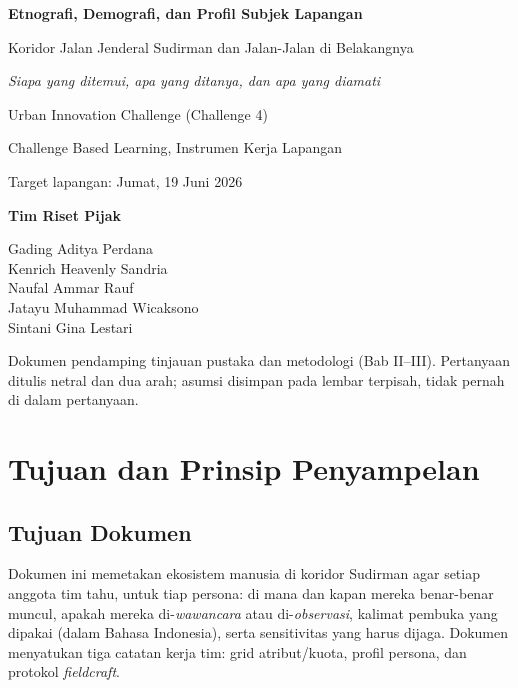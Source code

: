\documentclass[11pt,a4paper]{report}
\newcommand{\teamname}{Tim Riset Pijak}
\begin{document}

\begin{titlepage}
\thispagestyle{empty}
\centering
\vspace*{2cm}

{\Large\bfseries Etnografi, Demografi, dan Profil Subjek Lapangan\par}
\vspace{0.5em}
{\large Koridor Jalan Jenderal Sudirman dan Jalan-Jalan di Belakangnya\par}
\vspace{0.3em}
{\normalsize\itshape Siapa yang ditemui, apa yang ditanya, dan apa yang diamati\par}
\vspace{1.6cm}

{\large Urban Innovation Challenge (Challenge 4)\par}
{\normalsize Challenge Based Learning, Instrumen Kerja Lapangan\par}
\vspace{0.6em}
{\normalsize Target lapangan: Jumat, 19 Juni 2026\par}
\vspace{2cm}

{\large\bfseries \teamname\par}
\vspace{0.8em}
{\normalsize
Gading Aditya Perdana \\
Kenrich Heavenly Sandria \\
Naufal Ammar Rauf \\
Jatayu Muhammad Wicaksono \\
Sintani Gina Lestari \par}

\vfill
{\footnotesize Dokumen pendamping tinjauan pustaka dan metodologi (Bab II--III).
Pertanyaan ditulis netral dan dua arah; asumsi disimpan pada lembar terpisah,
tidak pernah di dalam pertanyaan.\par}
\end{titlepage}

\tableofcontents
\clearpage
{}

\chapter{Tujuan dan Prinsip Penyampelan}

\section{Tujuan Dokumen}
Dokumen ini memetakan ekosistem manusia di koridor Sudirman agar setiap anggota
tim tahu, untuk tiap persona: di mana dan kapan mereka benar-benar muncul, apakah
mereka di-\emph{wawancara} atau di-\emph{observasi}, kalimat pembuka yang dipakai
(dalam Bahasa Indonesia), serta sensitivitas yang harus dijaga. Dokumen menyatukan
tiga catatan kerja tim: grid atribut/kuota, profil persona, dan protokol \emph{fieldcraft}.
\end{document}
